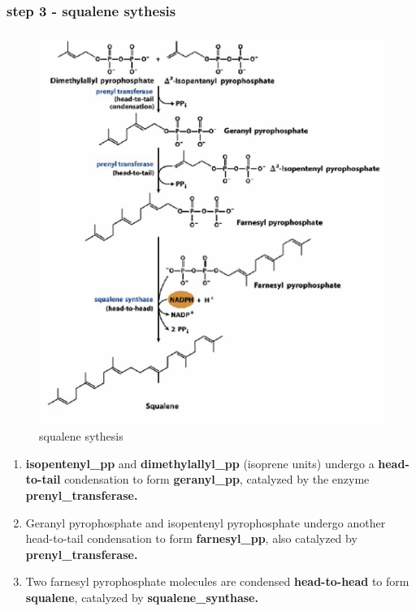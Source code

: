 \documentclass[../main.tex]{subfiles}
\begin{document}
\subsubsection{step 3 - squalene sythesis}
\begin{figure}[H]
    \centering
    \includegraphics[width=0.5\linewidth]{squaleneSythesis.png}
    \caption{squalene sythesis}
    \label{fig:enter-label}
\end{figure}


\begin{enumerate}
    \item \textbf{\gls{isopentenyl_pp}} and \textbf{\gls{dimethylallyl_pp}} (isoprene units) undergo a \textbf{head-to-tail} condensation to form \textbf{\gls{geranyl_pp}}, catalyzed by the enzyme \textbf{\gls{prenyl_transferase}.}
    
    \item Geranyl pyrophosphate and isopentenyl pyrophosphate undergo another head-to-tail condensation to form \textbf{\gls{farnesyl_pp}}, also catalyzed by \textbf{\gls{prenyl_transferase}.}
    
    \item Two farnesyl pyrophosphate molecules are condensed \textbf{head-to-head} to form \textbf{\gls{squalene}}, catalyzed by \textbf{\gls{squalene_synthase}.}
\end{enumerate}
\end{document}
